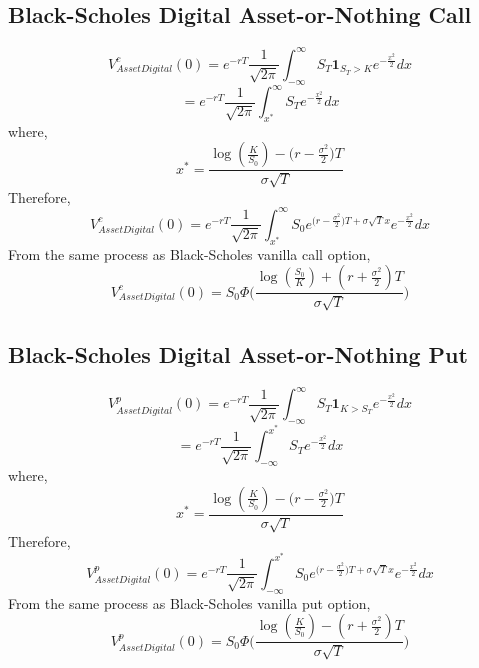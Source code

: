 \documentclass[fleqn,12pt]{SelfArx}
\begin{document}
\subsection{Black-Scholes Digital Asset-or-Nothing Call}
$$
V^{c}_{Asset Digital}(0) = e^{-rT}\frac{1}{\sqrt{2\pi}}\int_{-\infty}^{\infty}S_T\mathbf{1}_{S_T>K}e^{-\frac{x^{2}}{2}}dx
$$
$$
= e^{-rT}\frac{1}{\sqrt{2\pi}}\int_{x^{*}}^{\infty}S_Te^{-\frac{x^{2}}{2}}dx
$$
where,
$$
x^{*} = \frac{\log({\frac{K}{S_0}})-\big(r-\frac{\sigma^{2}}{2}\big)T}{\sigma\sqrt{T}} 
$$
Therefore,
$$
V^{c}_{Asset Digital}(0) = e^{-rT}\frac{1}{\sqrt{2\pi}}\int_{x^{*}}^{\infty}S_0e^{\big(r-\frac{\sigma^{2}}{2}\big)T +\sigma\sqrt{T}x}e^{-\frac{x^{2}}{2}}dx
$$
From the same process as Black-Scholes vanilla call option,
$$
 V^{c}_{Asset Digital}(0) = S_0\Phi\Bigg(\frac{\log({\frac{S_0}{K}})+(r+\frac{\sigma^{2}}{2})T}{\sigma\sqrt{T}} \Bigg)
$$

\subsection{Black-Scholes Digital Asset-or-Nothing Put}
$$
V^{p}_{Asset Digital}(0) = e^{-rT}\frac{1}{\sqrt{2\pi}}\int_{-\infty}^{\infty}S_T\mathbf{1}_{K>S_T}e^{-\frac{x^{2}}{2}}dx
$$
$$
= e^{-rT}\frac{1}{\sqrt{2\pi}}\int_{-\infty}^{x^{*}}S_Te^{-\frac{x^{2}}{2}}dx
$$
where,
$$
x^{*} = \frac{\log({\frac{K}{S_0}})-\big(r-\frac{\sigma^{2}}{2}\big)T}{\sigma\sqrt{T}} 
$$
Therefore,
$$
V^{p}_{Asset Digital}(0) = e^{-rT}\frac{1}{\sqrt{2\pi}}\int_{-\infty}^{x^{*}}S_0e^{\big(r-\frac{\sigma^{2}}{2}\big)T +\sigma\sqrt{T}x}e^{-\frac{x^{2}}{2}}dx
$$
From the same process as Black-Scholes vanilla put option,
$$
V^{p}_{Asset Digital}(0) = S_0\Phi\Bigg(\frac{\log({\frac{K}{S_0}})-(r+\frac{\sigma^{2}}{2})T}{\sigma\sqrt{T}}\Bigg)
$$
\end{document}
